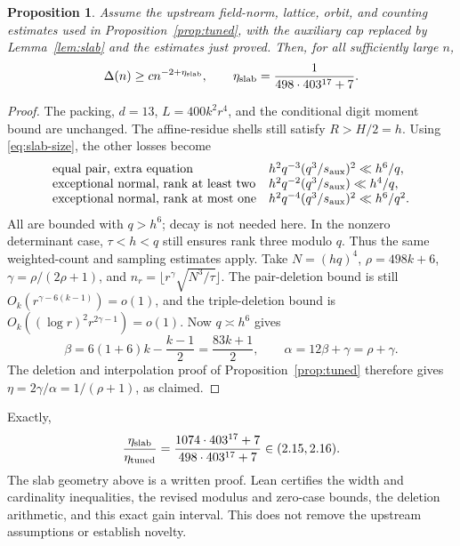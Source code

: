 \documentclass[11pt]{article}
\newtheorem{proposition}[lemma]{Proposition}
\begin{document}
\begin{proposition}\label{prop:slab}
Assume the upstream field-norm, lattice, orbit, and counting estimates
used in Proposition~\ref{prop:tuned}, with the auxiliary cap replaced
by Lemma~\ref{lem:slab} and the estimates just proved. Then, for all
sufficiently large \(n\),
\[
 \Delta(n)\ge c n^{-2+\eta_{\rm slab}},\qquad
 \eta_{\rm slab}=\frac1{498\cdot403^{17}+7}.
\]
\end{proposition}
\begin{proof}
The packing, \(d=13\), \(L=400k^2r^4\), and the conditional digit
moment bound are unchanged. The affine-residue shells still satisfy
\(R>H/2=h\). Using \eqref{eq:slab-size}, the other losses become
\[
\begin{array}{ll}
 \text{equal pair, extra equation}
   &h^2q^{-3}(q^3/s_{\rm aux})^2\ll h^6/q,\\
 \text{exceptional normal, rank at least two}
   &h^2q^{-2}(q^3/s_{\rm aux})\ll h^4/q,\\
 \text{exceptional normal, rank at most one}
   &h^2q^{-4}(q^3/s_{\rm aux})^2\ll h^6/q^2.
\end{array}
\]
All are bounded with \(q>h^6\); decay is not needed here. In the
nonzero determinant case, \(\tau<h<q\) still ensures rank three
modulo \(q\). Thus the same weighted-count and sampling estimates apply.
Take \(N=(hq)^4\), \(\rho=498k+6\),
\(\gamma=\rho/(2\rho+1)\), and
\(n_r=\lfloor r^\gamma\sqrt{N^3/\tau}\rfloor\).
The pair-deletion bound is still
\(O_k(r^{\gamma-6(k-1)})=o(1)\), and the triple-deletion bound
is \(O_k((\log r)^2r^{2\gamma-1})=o(1)\).
Now \(q\asymp h^6\) gives
\[
 \beta=6(1+6)k-\frac{k-1}{2}=\frac{83k+1}{2},\qquad
 \alpha=12\beta+\gamma=\rho+\gamma.
\]
The deletion and interpolation proof of Proposition~\ref{prop:tuned}
therefore gives \(\eta=2\gamma/\alpha=1/(\rho+1)\), as claimed.
\end{proof}

Exactly,
\[
 \frac{\eta_{\rm slab}}{\eta_{\rm tuned}}
 =\frac{1074\cdot403^{17}+7}{498\cdot403^{17}+7}
 \in(2.15,2.16).
\]
The slab geometry above is a written proof. Lean certifies the width
and cardinality inequalities, the revised modulus and zero-case
bounds, the deletion arithmetic, and this exact gain interval.
This does not remove the upstream assumptions or establish novelty.
\end{document}
